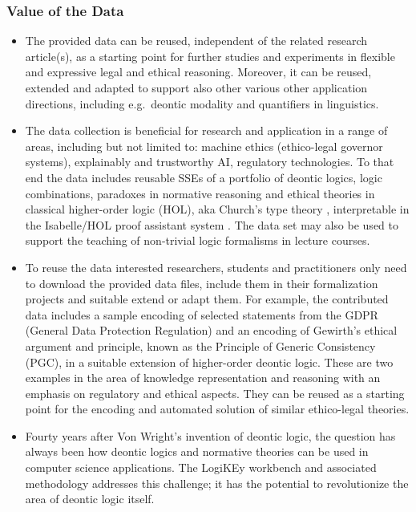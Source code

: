 \documentclass{article}
\begin{document}
\subsubsection*{Value of the Data}
\begin{itemize}
\item The provided data can be reused, independent of the related
  research article(s), as a starting point for further studies and
  experiments in flexible and expressive legal and ethical
  reasoning. Moreover, it can be reused, extended and adapted to
  support also other various other application directions, including
  e.g.~deontic modality and quantifiers in linguistics.

\item The data collection is beneficial for research and application
  in a range of areas, including but not limited to: machine ethics
  (ethico-legal governor systems), explainably and trustworthy AI,
  regulatory technologies. To that end the data includes reusable SSEs
  of a portfolio of deontic logics, logic combinations, paradoxes in
  normative reasoning and ethical theories in classical higher-order
  logic (HOL), aka Church's type theory \cite{J43}, interpretable in
  the Isabelle/HOL proof assistant system \cite{Isabelle}. The data
  set may also be used to support the teaching of non-trivial logic
  formalisms in lecture courses.

\item To reuse the data interested researchers, 
  students and practitioners only 
  need to download the provided data files, include them in their
  formalization projects and suitable extend or adapt them. For
  example, the contributed data includes a sample encoding of selected
  statements from the GDPR (General Data Protection Regulation) and an
  encoding of Gewirth’s ethical argument and principle, known as the
  Principle of Generic Consistency (PGC), in a suitable extension of
  higher-order deontic logic. These are two examples in the area of
  knowledge representation and reasoning with an emphasis on
  regulatory and ethical aspects. They can be reused as a starting
  point for the encoding and automated solution of similar
  ethico-legal theories.

\item Fourty years after Von Wright's invention of deontic logic, the
  question has always been how deontic logics and normative theories
  can be used in computer science applications. The LogiKEy 
  workbench and associated methodology addresses this challenge; it has the potential to revolutionize the
  area of deontic logic itself.



\end{itemize}
\end{document}
